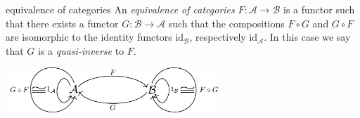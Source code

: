 \begin{frame}
\begin{block}{equivalence of categories}
An {\it equivalence of categories}
$F : \mathcal{A} \to \mathcal{B}$ is a functor such that there
exists a functor $G : \mathcal{B} \to \mathcal{A}$ such that
the compositions $F \circ G$ and $G \circ F$ are isomorphic to the
identity functors $\text{id}_\mathcal{B}$,
respectively $\text{id}_\mathcal{A}$.
In this case we say that $G$ is a {\it quasi-inverse} to $F$.
\end{block}
\begin{block}{}
\begin{center}
\includegraphics[width=0.6\textwidth]{fig/eqcat.pdf}
\end{center}
\end{block}
\end{frame}